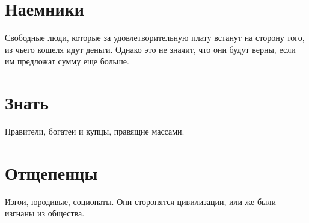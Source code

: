 \section{Наемники}
Свободные люди, которые за удовлетворительную плату встанут на сторону того, из чьего кошеля идут деньги. Однако это не значит, что они будут верны, если им предложат сумму еще больше.

\section{Знать}
Правители, богатеи и купцы, правящие массами.

\section{Отщепенцы}
Изгои, юродивые, социопаты. Они сторонятся цивилизации, или же были изгнаны из общества.
